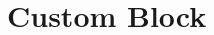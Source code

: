 \documentclass[11pt]{article}
\begin{document}
\begin{multicols}{2}




      \label{sec:custom_block}
      \section{Custom Block}


\end{multicols}
\end{document}
